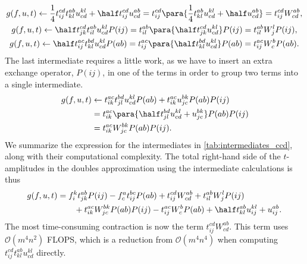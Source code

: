         \begin{gather}
            g(f, u, t)
            \gets
            \frac{1}{4} t^{cd}_{ij} t^{ab}_{kl} u^{kl}_{cd}
            + \half t^{cd}_{ij} u^{ab}_{cd}
            =
            t^{cd}_{ij}\para{
                \frac{1}{4} t^{ab}_{kl} u^{kl}_{cd}
                + \half u^{ab}_{cd}
            }
            = t^{cd}_{ij}W^{ab}_{cd},
            \\
            g(f, u, t)
            \gets
            \half t^{cd}_{jk} t^{ab}_{il} u^{kl}_{cd} P(ij)
            = t^{ab}_{il}\para{
                \half t^{cd}_{jk} u^{kl}_{cd}
            } P(ij)
            = t^{ab}_{il} W^{l}_{j} P(ij),
            \\
            g(f, u, t)
            \gets
            \half t^{ac}_{ij} t^{bd}_{kl} u^{kl}_{cd} P(ab)
            = t^{ac}_{ij}\para{
                \half t^{bd}_{kl} u^{kl}_{cd}
            } P(ab)
            = t^{ac}_{ij} W^{b}_{c} P(ab).
        \end{gather}
        The last intermediate requires a little work, as we have to insert an
        extra exchange operator, $P(ij)$, in one of the terms in order to group
        two terms into a single intermediate.
        \begin{align}
            g(f, u, t)
            &\gets
            t^{ac}_{ik} t^{bd}_{jl} u^{kl}_{cd} P(ab)
            + t^{ac}_{ik} u^{bk}_{jc} P(ab) P(ij)
            \\
            &= t^{ac}_{ik}\para{
                \half t^{bd}_{jl} u^{kl}_{cd}
                + u^{bk}_{jc}
            } P(ab) P(ij)
            \\
            &= t^{ac}_{ik} W^{bk}_{jc} P(ab) P(ij).
        \end{align}
        We summarize the expression for the intermediates in
        \autoref{tab:intermediates_ccd}, along with their computational
        complexity. The total right-hand side of the $t$-amplitudes in the
        doubles approximation using the intermediate calculations is thus
        \begin{align}
            g(f, u, t)
            &=
            f^{k}_{i} t^{ab}_{jk} P(ij)
            - f^{a}_{c} t^{bc}_{ij} P(ab)
            + t^{cd}_{ij} W^{ab}_{cd}
            + t^{ab}_{il} W^{l}_{j} P(ij)
            \nonumber \\
            &\qquad
            + t^{ac}_{ik} W^{bk}_{jc} P(ab) P(ij)
            - t^{ac}_{ij} W^{b}_{c} P(ab)
            + \half t^{ab}_{kl} u^{kl}_{ij}
            + u^{ab}_{ij}.
        \end{align}
        The most time-consuming contraction is now the term $t^{cd}_{ij}
        W^{ab}_{cd}$. This term uses $\mathcal{O}(m^4 n^2)$ FLOPS, which is a
        reduction from $\mathcal{O}(m^4 n^4)$ when computing $t^{cd}_{ij}
        t^{ab}_{kl} u^{kl}_{cd}$ directly.

